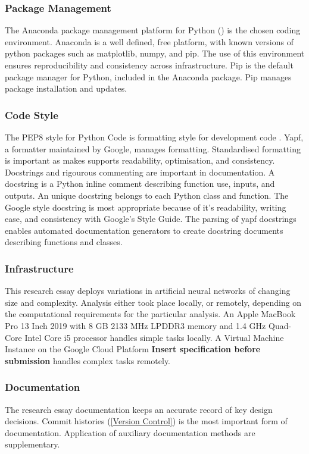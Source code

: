 \documentclass[12pt]{article}
\begin{document}
\subsubsection{Package Management}
The Anaconda package management platform for Python (\cite{Anaconda}) is the chosen coding environment.
Anaconda is a well defined, free platform, with known versions of python packages such as matplotlib, numpy, and pip.
The use of this environment ensures reproducibility and consistency across infrastructure.
Pip is the default package manager for Python, included in the Anaconda package. 
Pip manages package installation and updates.

\subsubsection{Code Style} \label{CS}
The PEP8 style for Python Code is formatting style for development code \cite{PEP8}. 
Yapf, a formatter maintained by Google, manages formatting.
Standardised formatting is important as makes supports readability, optimisation, and consistency.
Docstrings and rigourous commenting are important in documentation. 
A docstring is a Python inline comment describing function use, inputs, and outputs.
An unique docstring belongs to each Python class and function. 
The Google style docstring is most appropriate because of it's readability, writing ease, and consistency with Google's Style Guide.
The parsing of yapf docstrings enables automated documentation generators to create docstring documents describing functions and classes.

\subsubsection{Infrastructure}
This research essay deploys variations in artificial neural networks of changing size and complexity.
Analysis either took place locally, or remotely, depending on the computational requirements for the particular analysis.
An Apple MacBook Pro 13 Inch 2019 with 8 GB 2133 MHz LPDDR3 memory and 1.4 GHz Quad-Core Intel Core i5 processor handles simple tasks locally.
A Virtual Machine Instance on the Google Cloud Platform \textbf{Insert specification before submission} handles complex tasks remotely.

\subsubsection{Documentation}
The research essay documentation keeps an accurate record of key design decisions.
Commit histories (\ref{Version Control}) is the most important form of documentation.
Application of auxiliary documentation methods are supplementary.
\end{document}
